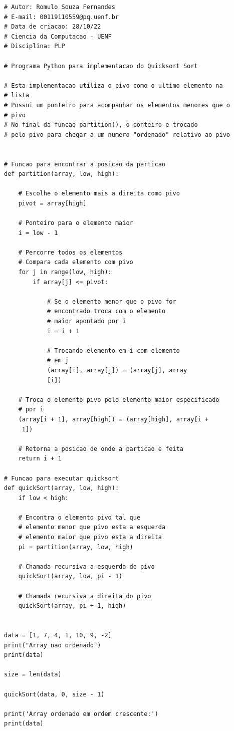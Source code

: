 \begin{lstlisting}
# Autor: Romulo Souza Fernandes
# E-mail: 00119110559@pq.uenf.br
# Data de criacao: 28/10/22
# Ciencia da Computacao - UENF
# Disciplina: PLP

# Programa Python para implementacao do Quicksort Sort

# Esta implementacao utiliza o pivo como o ultimo elemento na 
# lista
# Possui um ponteiro para acompanhar os elementos menores que o 
# pivo
# No final da funcao partition(), o ponteiro e trocado 
# pelo pivo para chegar a um numero "ordenado" relativo ao pivo


# Funcao para encontrar a posicao da particao
def partition(array, low, high):

	# Escolhe o elemento mais a direita como pivo
	pivot = array[high]

	# Ponteiro para o elemento maior
	i = low - 1

	# Percorre todos os elementos
	# Compara cada elemento com pivo
	for j in range(low, high):
		if array[j] <= pivot:

			# Se o elemento menor que o pivo for 
			# encontrado troca com o elemento 
			# maior apontado por i
			i = i + 1

			# Trocando elemento em i com elemento 
			# em j
			(array[i], array[j]) = (array[j], array
			[i])

	# Troca o elemento pivo pelo elemento maior especificado 
	# por i
	(array[i + 1], array[high]) = (array[high], array[i +
	 1])

	# Retorna a posicao de onde a particao e feita
	return i + 1

# Funcao para executar quicksort
def quickSort(array, low, high):
	if low < high:

	# Encontra o elemento pivo tal que
	# elemento menor que pivo esta a esquerda
	# elemento maior que pivo esta a direita
	pi = partition(array, low, high)

	# Chamada recursiva a esquerda do pivo
	quickSort(array, low, pi - 1)

	# Chamada recursiva a direita do pivo
	quickSort(array, pi + 1, high)


data = [1, 7, 4, 1, 10, 9, -2]
print("Array nao ordenado")
print(data)

size = len(data)

quickSort(data, 0, size - 1)

print('Array ordenado em ordem crescente:')
print(data)
\end{lstlisting}

